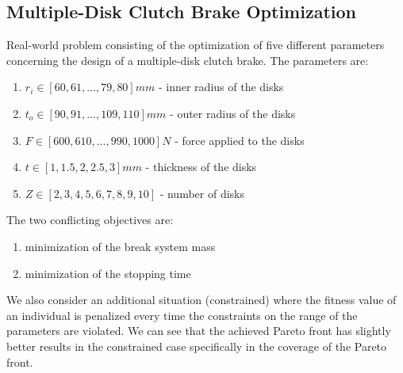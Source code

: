 \subsection{Multiple-Disk Clutch Brake Optimization}
Real-world problem consisting of the optimization of five different parameters concerning the design of a multiple-disk clutch brake. The parameters are:
\begin{enumerate}
    \item $r_i \in [60,61,...,79,80]mm$ - inner radius of the disks
    \item $t_o \in [90,91,...,109,110]mm$ - outer radius of the disks
    \item $F \in [600,610,...,990,1000]N$ - force applied to the disks
    \item $t \in [1,1.5,2,2.5,3]mm$ - thickness of the disks
    \item $Z \in [2,3,4,5,6,7,8,9,10]$ - number of disks
\end{enumerate}
The two conflicting objectives are:
\begin{enumerate}
    \item minimization of the break system mass
    \item minimization of the stopping time
\end{enumerate}
We also consider an additional situation (constrained) where the fitness value of an individual is penalized every time the constraints on the range of the parameters are violated. We can see that the achieved Pareto front has slightly better results in the constrained case specifically in the coverage of the Pareto front.

